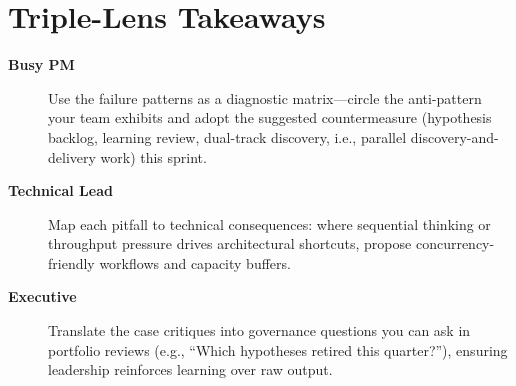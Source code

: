 \section{Triple-Lens Takeaways}
\label{sec:failures-triple}

\begin{description}
    \item[\textbf{Busy PM}] Use the failure patterns as a diagnostic matrix—circle the anti-pattern your team exhibits and adopt the suggested countermeasure (hypothesis backlog, learning review, dual-track discovery, i.e., parallel discovery-and-delivery work) this sprint.
    \item[\textbf{Technical Lead}] Map each pitfall to technical consequences: where sequential thinking or throughput pressure drives architectural shortcuts, propose concurrency-friendly workflows and capacity buffers.
    \item[\textbf{Executive}] Translate the case critiques into governance questions you can ask in portfolio reviews (e.g., ``Which hypotheses retired this quarter?''), ensuring leadership reinforces learning over raw output.
\end{description}
